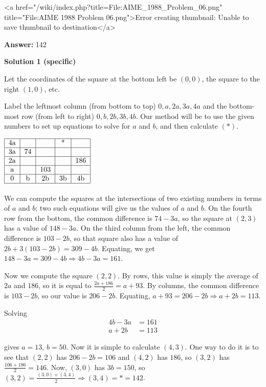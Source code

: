 \begin{enumerate}
 <a href="/wiki/index.php?title=File:AIME\_1988\_Problem\_06.png" title="File:AIME 1988 Problem 06.png">Error creating thumbnail: Unable to save thumbnail to destination</a>

 \textbf{Answer: }142



\textbf{Solution 1 (specific)}

Let the coordinates of the square at the bottom left be $(0,0)$, the square to the right $(1,0)$, etc.

 Label the leftmost column (from bottom to top) $0, a, 2a, 3a, 4a$ and the bottom-most row (from left to right) $0, b, 2b, 3b, 4b$. Our method will be to use the given numbers to set up equations to solve for $a$ and $b$, and then calculate $(*)$.

 $\begin{tabular}[b]{|c|c|c|c|c|}\hline 4a & & & * & \\ \hline 3a & 74 & & & \\ \hline 2a & & & & 186 \\ \hline a & & 103 & & \\ \hline 0 & b & 2b & 3b & 4b \\ \hline \end{tabular}$

 We can compute the squares at the intersections of two existing numbers in terms of $a$ and $b$; two such equations will give us the values of $a$ and $b$. On the fourth row from the bottom, the common difference is $74 - 3a$, so the square at $(2,3)$ has a value of $148 - 3a$. On the third column from the left, the common difference is $103 - 2b$, so that square also has a value of $2b + 3(103 - 2b) = 309 - 4b$. Equating, we get $148 - 3a = 309 - 4b \Longrightarrow 4b - 3a = 161$.

 Now we compute the square $(2,2)$. By rows, this value is simply the average of $2a$ and $186$, so it is equal to $\frac{2a + 186}{2} = a + 93$. By columns, the common difference is $103 - 2b$, so our value is $206 - 2b$. Equating, $a + 93 = 206 - 2b \Longrightarrow a + 2b = 113$.

 Solving 
 \begin{align*}4b - 3a &= 161\\ a + 2b &= 113 \end{align*}


 gives $a = 13$, $b = 50$. Now it is simple to calculate $(4,3)$. One way to do it is to see that $(2,2)$ has $206 - 2b = 106$ and $(4,2)$ has $186$, so $(3,2)$ has $\frac{106 + 186}{2} = 146$. Now, $(3,0)$ has $3b = 150$, so $(3,2) = \frac{(3,0) + (3,4)}{2} \Longrightarrow (3,4) = * = \boxed{142}$.


\end{enumerate}
